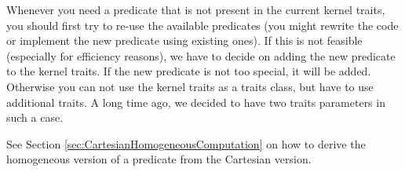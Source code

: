 Whenever you need a predicate that is not present in the current kernel
traits, you should first try to re-use the available predicates (you
might rewrite the code or implement the new predicate using existing ones).
If this is not feasible (especially for efficiency reasons), we have to 
decide on adding the new predicate to the kernel traits. 
If the new predicate is not too special, it will be added. 
Otherwise you can not use the kernel traits as a traits class, but have
to use additional traits.%
 A long time ago, 
we decided to have two traits parameters in such a case.

See Section \ref{sec:CartesianHomogeneousComputation} on how to derive the
homogeneous version of a predicate from the Cartesian version. 


